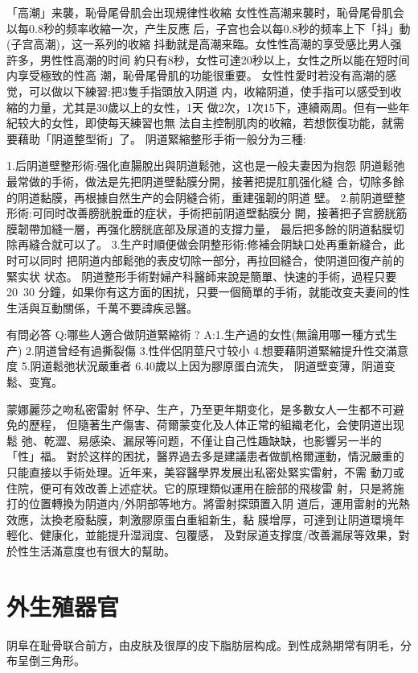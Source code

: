 \documentclass[12pt,UTF8]{ctexbook}
\begin{document}
「高潮」来襲，恥骨尾骨肌会出现規律性收縮
女性性高潮来襲时，恥骨尾骨肌会以每0.8秒的频率收縮一次，产生反應
后，子宫也会以每0.8秒的频率上下「抖」動(子宫高潮)，这一系列的收縮
抖動就是高潮来臨。女性性高潮的享受感比男人强許多，男性性高潮的时间
約只有8秒，女性可達20秒以上，女性之所以能在短时间内享受極致的性高
潮，恥骨尾骨肌的功能很重要。
女性性愛时若没有高潮的感觉，可以做以下練習:把3隻手指頭放入阴道
内，收縮阴道，使手指可以感受到收縮的力量，尤其是30歲以上的女性，1天
做2次，1次15下，連續兩周。但有一些年紀较大的女性，即使每天練習也無
法自主控制肌肉的收縮，若想恢復功能，就需要藉助「阴道整型術」了。
阴道緊縮整形手術一般分为三種:

1.后阴道壁整形術:强化直腸脫出與阴道鬆弛，这也是一般夫妻因为抱怨
阴道鬆弛最常做的手術，做法是先把阴道壁黏膜分開，接著把提肛肌强化縫
合，切除多餘的阴道黏膜，再根據自然生产的会阴縫合術，重建强韌的阴道
壁。
2.前阴道壁整形術:可同时改善膀胱脫垂的症状，手術把前阴道壁黏膜分
開，接著把子宫膀胱筋膜韌帶加縫一層，再强化膀胱底部及尿道的支撐力量，
最后把多餘的阴道黏膜切除再縫合就可以了。
3.生产时順便做会阴整形術:修補会阴缺口处再重新縫合，此时可以同时
把阴道内部鬆弛的表皮切除一部分，再拉回縫合，使阴道回復产前的緊实状
状态。
阴道整形手術對婦产科醫師来說是簡單、快速的手術，過程只要20~30
分鐘，如果你有这方面的困扰，只要一個簡單的手術，就能改变夫妻间的性
生活與互動關係，千萬不要諱疾忌醫。

有問必答
Q:哪些人適合做阴道緊縮術 ?
A:1.生产過的女性(無論用哪一種方式生产)
2.阴道曾经有過撕裂傷
3.性伴侶阴莖尺寸较小
4.想要藉阴道緊縮提升性交滿意度
5.阴道鬆弛状況嚴重者
6.40歲以上因为膠原蛋白流失，
阴道壁变薄，阴道变鬆、变寬。

蒙娜麗莎之吻私密雷射
怀孕、生产，乃至更年期变化，是多數女人一生都不可避免的歷程，
但隨著生产傷害、荷爾蒙变化及人体正常的組織老化，会使阴道出现鬆
弛、乾澀、易感染、漏尿等问题，不僅让自己性趣缺缺，也影響另一半的
「性」福。
對於这样的困扰，醫界過去多是建議患者做凱格爾運動，情況嚴重的
只能直接以手術处理。近年来，美容醫學界发展出私密处緊实雷射，不需
動刀或住院，便可有效改善上述症状。它的原理類似運用在臉部的飛梭雷
射，只是將施打的位置轉換为阴道内/外阴部等地方。將雷射探頭置入阴
道后，運用雷射的光熱效應，汰換老廢黏膜，刺激膠原蛋白重組新生，黏
膜增厚，可達到让阴道環境年輕化、健康化，並能提升湿润度、包覆感，
及對尿道支撑度/改善漏尿等效果，對於性生活滿意度也有很大的幫助。

\section{外生殖器官}

阴阜在耻骨联合前方，由皮肤及很厚的皮下脂肪层构成。到性成熟期常有阴毛，分布呈倒三角形。
\end{document}
